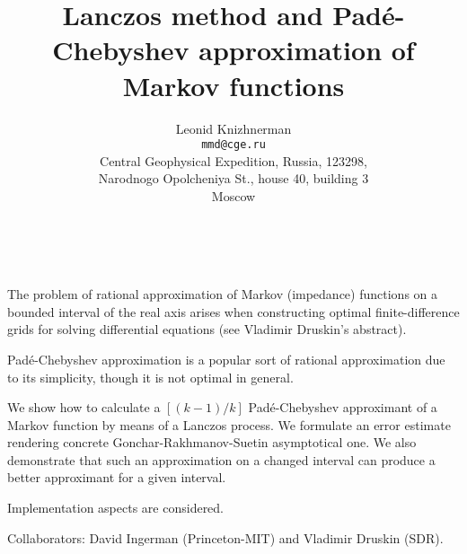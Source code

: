 \documentclass[11pt]{article}
\date{ ~ \hspace{-4mm}}
\title{Lanczos method and Pad\'{e}-Chebyshev approximation of Markov functions  }
\author{Leonid Knizhnerman \\ {\tt  mmd@cge.ru} \\ Central Geophysical Expedition, Russia, 123298, \\ Narodnogo Opolcheniya St., house 40, building 3 \\ Moscow}
\begin{document}
\maketitle
\thispagestyle{empty}





 



The problem of rational approximation of Markov (impedance) functions on a
bounded interval of the real axis arises when constructing optimal
finite-difference grids for solving differential equations (see Vladimir
Druskin's abstract).







Pad\'{e}-Chebyshev approximation is a popular sort of rational
approximation due to its simplicity, though it is not optimal in general.







We show how to calculate a $\left[(k-1)/k\right]$
Pad\'{e}-Chebyshev approximant of a Markov function by
means of a Lanczos process.
We formulate an error estimate rendering concrete Gonchar-Rakhmanov-Suetin
asymptotical one. We also demonstrate that such an approximation on a
changed
interval can produce a better approximant for a given interval.







Implementation aspects are considered.







Collaborators: David Ingerman
(Princeton-MIT) and Vladimir Druskin (SDR).
\end{document}
